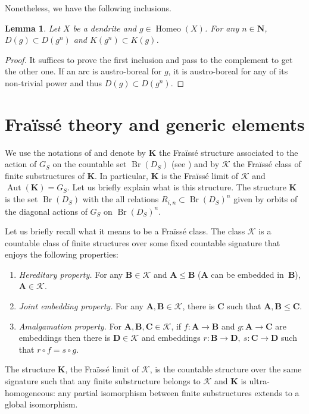 \documentclass[JEP,XML,SOM,Unicode,NoFloatCountersInSection]{cedram}
\let\mathcal\mathscr
\theoremstyle{plain}
\newtheorem{lem}[thm]{Lemma}
\theoremstyle{definition}
\newcommand{\bA}{{\boldsymbol{A}}}
\newcommand{\bB}{{\boldsymbol{B}}}
\newcommand{\bC}{{\boldsymbol{C}}}
\newcommand{\bD}{{\boldsymbol{D}}}
\newcommand{\bK}{{\boldsymbol{K}}}
\newcommand{\NN}{\mathbf{N}}
\newcommand{\cK}{\mathcal{K}}
\DeclareMathOperator{\Aut}{Aut}
\DeclareMathOperator{\Homeo}{Homeo}
\DeclareMathOperator{\Br}{Br}
\begin{document}
Nonetheless, we have the following inclusions.

\begin{lem}\label{KD}Let $X$ be a dendrite and $g\!\in\!\Homeo(X)$. For any $n\!\in\!\NN$, $D(g)\!\subset\!D(g^n)$ and $K(g^n)\subset K(g)$.
\end{lem}

\begin{proof} It suffices to prove the first inclusion and pass to the complement to get the other one. If an arc is austro-boreal for $g$, it is austro-boreal for any of its non-trivial power and thus $D(g)\subset D(g^n)$.
\end{proof}

\section{Fraïssé theory and generic elements}\label{fraisse} We use the notations of \cite{Kechris-Rosendal} and denote by $\bK$ the Fraïssé structure associated to the action of $G_S$ on the countable set $\Br(D_S)$ (see \cite[\S 1.2]{Kechris-Rosendal}) and by $\cK$ the Fraïssé class of finite substructures of $\bK$. In particular, $\bK$ is the Fraïssé limit of $\cK$ and $\Aut(\bK)=G_S$. Let us briefly explain what is this structure. The structure $\bK$ is the set $\Br(D_S)$ with the all relations $R_{i,n}\subset \Br(D_S)^n$ given by orbits of the diagonal actions of $G_S$ on $\Br(D_S)^n$.

Let us briefly recall what it means to be a Fraïssé class. The class $\cK$ is a countable class of finite structures over some fixed countable signature that enjoys the following properties:
\begin{enumerate}
\item\textit{Hereditary property.} For any $\bB\!\in\!\cK$ and $\bA\!\leq\!\bB$ (\ie $\bA$ can be embedded in~$\bB$), $\bA\in\cK$.
\item\textit{Joint embedding property.} For any $\bA,\bB\in\cK$, there is $\bC$ such that $\bA,\bB\leq\bC$.
\item\textit{Amalgamation property. }For $\bA,\bB,\bC\in\cK$, if $f\colon\bA\to\bB$ and $g\colon\bA\to\bC$ are embeddings then there is $\bD\in\cK$ and embeddings $r\colon\bB\to\bD,\ s\colon\bC\to\bD$ such that $r\circ f=s\circ g$.
\end{enumerate}
The structure $\bK$, the Fraïssé limit of $\cK$, is the countable structure over the same signature such that any finite substructure belongs to $\cK$ and $\bK$ is ultra-homogeneous: any partial isomorphism between finite substructures extends to a global isomorphism.
\end{document}

